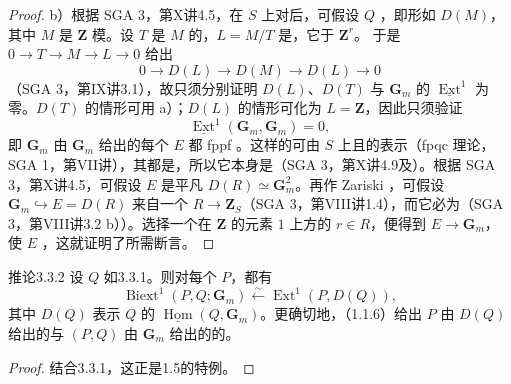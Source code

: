 \begin{proof}
 b）根据 SGA 3，第X讲4.5，在 $S$ 上对后，可假设 $Q$ ，即形如 $D(M)$，其中 $M$ 是 $\mathbf Z$ 模。设 $T$ 是 $M$ 的，$L=M/T$ 是，它于 $\mathbf Z^r$。
于是 $0\to T\to M\to L\to0$ 给出
\[0\longrightarrow D(L)\longrightarrow D(M)\longrightarrow D(L)\longrightarrow0\]
（SGA 3，第IX讲3.1），故只须分别证明 $D(L)$、$D(T)$ 与 $\mathbf G_m$ 的 $\underline{\operatorname{Ext}}^1$ 为零。$D(T)$ 的情形可用 a）；$D(L)$ 的情形可化为 $L=\mathbf Z$，因此只须验证
\[\underline{\operatorname{Ext}}^1(\mathbf G_m,\mathbf G_m)=0,\]
即 $\mathbf G_m$ 由 $\mathbf G_m$ 给出的每个 $E$ 都 fppf 。这样的可由 $S$ 上且的表示（fpqc 理论，SGA 1，第VII讲），其都是，所以它本身是（SGA 3，第X讲4.9及）。根据 SGA 3，第X讲4.5，可假设 $E$ 是平凡 $D(R)\simeq\mathbf G_m^2$。再作 Zariski ，可假设 $\mathbf G_m\hookrightarrow E=D(R)$ 来自一个 $R\to\mathbf Z_S$（SGA 3，第VIII讲1.4），而它必为（SGA 3，第VIII讲3.2 b））。选择一个在 $\mathbf Z$ 的元素 $1$ 上方的 $r\in R$，便得到 $E\to\mathbf G_m$，使 $E$ ，这就证明了所需断言。
\end{proof}
\begin{SGAresult}{推论}{3.3.2}
设 $Q$ 如3.3.1。则对每个 $P$，都有
\[
\operatorname{Biext}^1(P,Q;\mathbf G_m)\xleftarrow{\sim}\operatorname{Ext}^1(P,D(Q)),\tag{3.3.2.1}
\]
其中 $D(Q)$ 表示 $Q$ 的 $\underline{\operatorname{Hom}}(Q,\mathbf G_m)$。更确切地，（1.1.6）给出 $P$ 由 $D(Q)$ 给出的与 $(P,Q)$ 由 $\mathbf G_m$ 给出的的。
\end{SGAresult}
\begin{proof}
结合3.3.1，这正是1.5的特例。
\end{proof}
